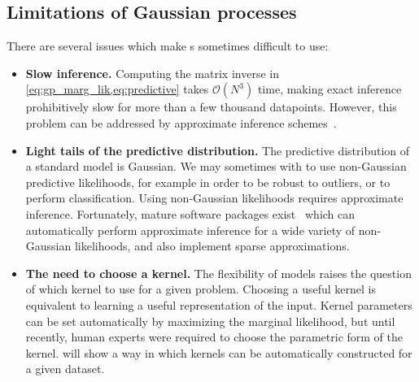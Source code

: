 \subsection{Limitations of Gaussian processes}

There are several issues which make \gp{}s sometimes difficult to use:

\begin{itemize}

\item {\bf Slow inference.}
Computing the matrix inverse in \cref{eq:gp_marg_lik,eq:predictive} takes $\mathcal{O}(N^3)$ time, making exact inference prohibitively slow for more than a few thousand datapoints.
However, this problem can be addressed by approximate inference schemes~\citep{snelson2006sparse, quinonero2005unifying, hensman2013gaussian}. 

\item {\bf Light tails of the predictive distribution.}
The predictive distribution of a standard \gp{} model is Gaussian.
We may sometimes with to use non-Gaussian predictive likelihoods, for example in order to be robust to outliers, or to perform classification.
Using non-Gaussian likelihoods requires approximate inference.
Fortunately, mature software packages exist~\citep{GPy, GPML, VanRiiHarJylVeh14} which can automatically perform approximate inference for a wide variety of non-Gaussian likelihoods, and also implement sparse approximations.

\item {\bf The need to choose a kernel.}
The flexibility of \gp{} models raises the question of which kernel to use for a given problem.
Choosing a useful kernel is equivalent to learning a useful representation of the input.
Kernel parameters can be set automatically by maximizing the marginal likelihood, but until recently, human experts were required to choose the parametric form of the kernel. %
 will show a way in which kernels can be automatically constructed for a given dataset.
\end{itemize}





